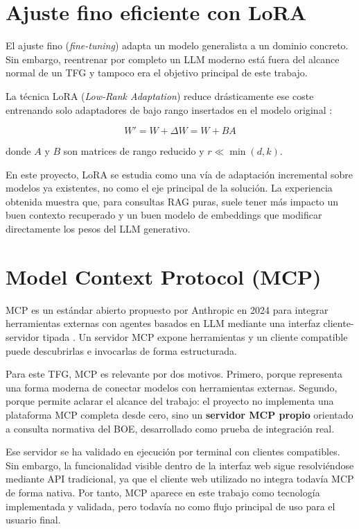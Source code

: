 \section{Ajuste fino eficiente con LoRA}
\label{sec:lora}

El ajuste fino (\textit{fine-tuning}) adapta un modelo generalista a un dominio concreto. Sin embargo, reentrenar por completo un LLM moderno está fuera del alcance normal de un TFG y tampoco era el objetivo principal de este trabajo.

La técnica LoRA (\textit{Low-Rank Adaptation}) reduce drásticamente ese coste entrenando solo adaptadores de bajo rango insertados en el modelo original \cite{hu2021lora}:

\begin{equation}
W' = W + \Delta W = W + BA
\end{equation}

donde $A$ y $B$ son matrices de rango reducido y $r \ll \min(d,k)$.

En este proyecto, LoRA se estudia como una vía de adaptación incremental sobre modelos ya existentes, no como el eje principal de la solución. La experiencia obtenida muestra que, para consultas RAG puras, suele tener más impacto un buen contexto recuperado y un buen modelo de embeddings que modificar directamente los pesos del LLM generativo.

\section{Model Context Protocol (MCP)}

MCP es un estándar abierto propuesto por Anthropic en 2024 para integrar herramientas externas con agentes basados en LLM mediante una interfaz cliente-servidor tipada \cite{anthropicMcpAnnouncement}. Un servidor MCP expone herramientas y un cliente compatible puede descubrirlas e invocarlas de forma estructurada.

Para este TFG, MCP es relevante por dos motivos. Primero, porque representa una forma moderna de conectar modelos con herramientas externas. Segundo, porque permite aclarar el alcance del trabajo: el proyecto no implementa una plataforma MCP completa desde cero, sino un \textbf{servidor MCP propio} orientado a consulta normativa del BOE, desarrollado como prueba de integración real.

Ese servidor se ha validado en ejecución por terminal con clientes compatibles. Sin embargo, la funcionalidad visible dentro de la interfaz web sigue resolviéndose mediante API tradicional, ya que el cliente web utilizado no integra todavía MCP de forma nativa. Por tanto, MCP aparece en este trabajo como tecnología implementada y validada, pero todavía no como flujo principal de uso para el usuario final.
